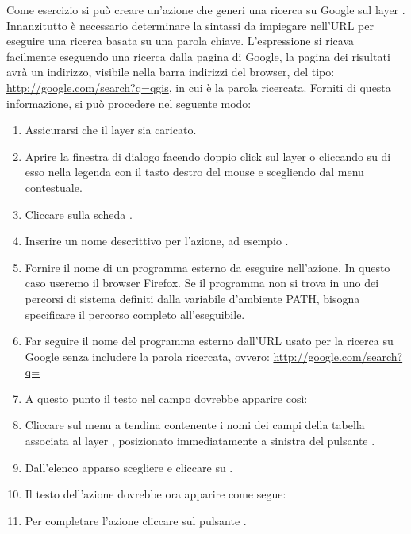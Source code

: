 Come esercizio si può creare un'azione che generi una ricerca su Google sul
layer . Innanzitutto è necessario determinare la sintassi da
impiegare nell'URL per eseguire una ricerca basata su una parola chiave.
L'espressione si ricava facilmente eseguendo una ricerca dalla pagina di
Google, la pagina dei risultati avrà un indirizzo, visibile nella barra
indirizzi del browser, del tipo: \url{http://google.com/search?q=qgis},
in cui  è la parola ricercata. Forniti di questa informazione,
si può procedere nel seguente modo:

\begin{enumerate}
\item Assicurarsi che il layer  sia caricato.
\item Aprire la finestra di dialogo  facendo
doppio click sul layer o cliccando su di esso nella legenda con il tasto
destro del mouse e scegliendo  dal menu contestuale.
\item Cliccare sulla scheda .
\item Inserire un nome descrittivo per l'azione, ad esempio .
\item Fornire il nome di un programma esterno da eseguire nell'azione. In
questo caso useremo il browser Firefox. Se il programma non si trova in uno
dei percorsi di sistema definiti dalla variabile d'ambiente PATH, bisogna
specificare il percorso completo all'eseguibile.
\item Far seguire il nome del programma esterno dall'URL usato per la ricerca
su Google senza includere la parola ricercata, ovvero:
  \url{http://google.com/search?q=}
\item A questo punto il testo nel campo  dovrebbe apparire
così:\\
\item Cliccare sul menu a tendina contenente i nomi dei campi della tabella
associata al layer , posizionato immediatamente a sinistra del
pulsante .
\item Dall'elenco apparso scegliere  e cliccare su .
\item Il testo dell'azione dovrebbe ora apparire come segue:\\ 
\item Per completare l'azione cliccare sul pulsante .
\end{enumerate}
 
